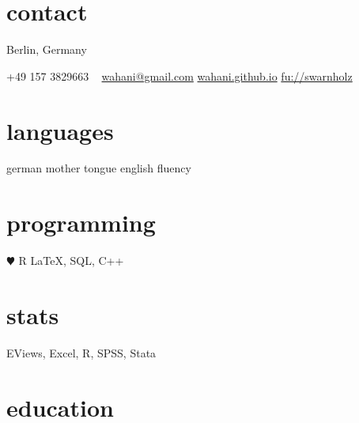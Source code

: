 \documentclass[]{friggeri-cv} %
\begin{document}


\begin{aside} %
\section{contact}
Berlin, Germany
~




+49 157 3829663
~
\href{mailto:wahani@gmail.com}{wahani@gmail.com}
\href{http://wahani.github.io/}{wahani.github.io}
\href{http://www.wiwiss.fu-berlin.de/fachbereich/vwl/Schmid/Team/Warnholz.html}{fu://swarnholz}
\section{languages}
german mother tongue
english fluency
\section{programming}
{\color{red} $\varheartsuit$} R
\LaTeX, SQL, C++
\section{stats}
EViews, Excel, R, 
SPSS, Stata
\end{aside}


\section{education}
\end{document}
